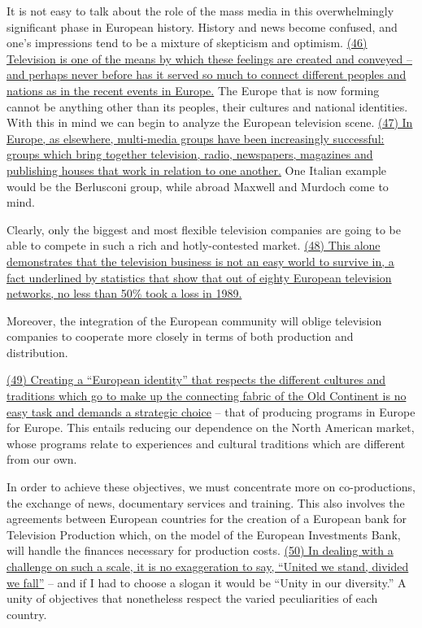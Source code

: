 \qquad It is not easy to talk about the role of the mass media in this overwhelmingly significant phase in European history. History and news become confused, and one's impressions tend to be a mixture of skepticism and optimism. \ul{(46) Television is one of the means by which these feelings are created and conveyed -- and perhaps never before has it served so much to connect different peoples and nations as in the recent events in Europe.} The Europe that is now forming cannot be anything other than its peoples, their cultures and national identities. With this in mind we can begin to analyze the European television scene. \ul{(47) In Europe, as elsewhere, multi-media groups have been increasingly successful: groups which bring together television, radio, newspapers, magazines and publishing houses that work in relation to one another.} One Italian example would be the Berlusconi group, while abroad Maxwell and Murdoch come to mind.

\qquad Clearly, only the biggest and most flexible television companies are going to be able to compete in such a rich and hotly-contested market. \ul{(48) This alone demonstrates that the television business is not an easy world to survive in, a fact underlined by statistics that show that out of eighty European television networks, no less than 50\% took a loss in 1989.}

\qquad Moreover, the integration of the European community will oblige television companies to cooperate more closely in terms of both production and distribution.

\qquad \ul{(49) Creating a ``European identity'' that respects the different cultures and traditions which go to make up the connecting fabric of the Old Continent is no easy task and demands a strategic choice} -- that of producing programs in Europe for Europe. This entails reducing our dependence on the North American market, whose programs relate to experiences and cultural traditions which are different from our own.

\qquad In order to achieve these objectives, we must concentrate more on co-productions, the exchange of news, documentary services and training. This also involves the agreements between European countries for the creation of a European bank for Television Production which, on the model of the European Investments Bank, will handle the finances necessary for production costs. \ul{(50) In dealing with a challenge on such a scale, it is no exaggeration to say, ``United we stand, divided we fall''} -- and if I had to choose a slogan it would be ``Unity in our diversity.'' A unity of objectives that nonetheless respect the varied peculiarities of each country.